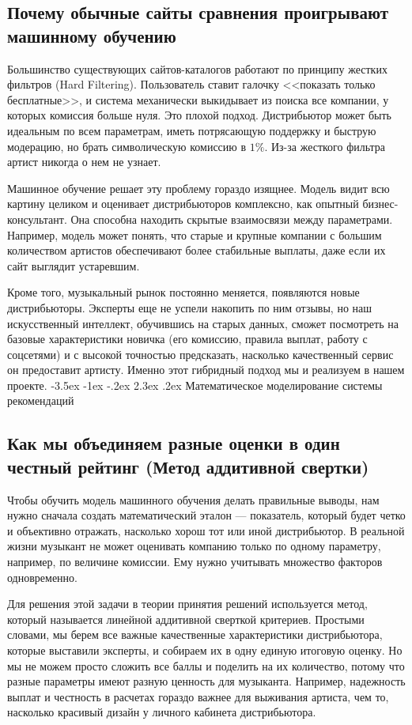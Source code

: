 \documentclass[14pt, a4paper]{extarticle}
\makeatletter
\renewcommand\section{\@startsection {section}{1}{\z@}%
 {-3.5ex \@plus -1ex \@minus -.2ex}%
 {2.3ex \@plus.2ex}%
{\centering\normalfont\Large\bfseries}}
\makeatother
\begin{document}
\subsection{Почему обычные сайты сравнения проигрывают машинному обучению}
Большинство существующих сайтов-каталогов работают по принципу жестких фильтров (Hard Filtering). Пользователь ставит галочку <<показать только бесплатные>>, и система механически выкидывает из поиска все компании, у которых комиссия больше нуля. Это плохой подход. Дистрибьютор может быть идеальным по всем параметрам, иметь потрясающую поддержку и быструю модерацию, но брать символическую комиссию в $1\%$. Из-за жесткого фильтра артист никогда о нем не узнает.

Машинное обучение решает эту проблему гораздо изящнее. Модель видит всю картину целиком и оценивает дистрибьюторов комплексно, как опытный бизнес-консультант. Она способна находить скрытые взаимосвязи между параметрами. Например, модель может понять, что старые и крупные компании с большим количеством артистов обеспечивают более стабильные выплаты, даже если их сайт выглядит устаревшим. 

Кроме того, музыкальный рынок постоянно меняется, появляются новые дистрибьюторы. Эксперты еще не успели накопить по ним отзывы, но наш искусственный интеллект, обучившись на старых данных, сможет посмотреть на базовые характеристики новичка (его комиссию, правила выплат, работу с соцсетями) и с высокой точностью предсказать, насколько качественный сервис он предоставит артисту. Именно этот гибридный подход мы и реализуем в нашем проекте.
\newpage
\section{Математическое моделирование системы рекомендаций}

\subsection{Как мы объединяем разные оценки в один честный рейтинг (Метод аддитивной свертки)}
Чтобы обучить модель машинного обучения делать правильные выводы, нам нужно сначала создать математический эталон — показатель, который будет четко и объективно отражать, насколько хорош тот или иной дистрибьютор. В реальной жизни музыкант не может оценивать компанию только по одному параметру, например, по величине комиссии. Ему нужно учитывать множество факторов одновременно. 

Для решения этой задачи в теории принятия решений используется метод, который называется линейной аддитивной сверткой критериев. Простыми словами, мы берем все важные качественные характеристики дистрибьютора, которые выставили эксперты, и собираем их в одну единую итоговую оценку. Но мы не можем просто сложить все баллы и поделить на их количество, потому что разные параметры имеют разную ценность для музыканта. Например, надежность выплат и честность в расчетах гораздо важнее для выживания артиста, чем то, насколько красивый дизайн у личного кабинета дистрибьютора.
\end{document}
